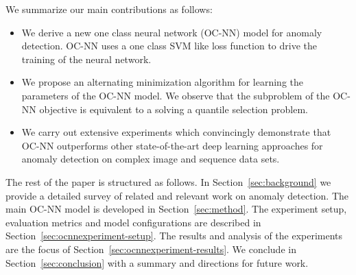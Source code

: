 
We summarize our main contributions as follows:
\begin{itemize}
\item We derive a new one class neural network (OC-NN) model for anomaly detection. OC-NN uses a one class SVM like loss function to drive the training
of the neural network.
\item We propose an alternating minimization algorithm for learning the parameters of the OC-NN model. We observe that the subproblem of
the OC-NN objective is equivalent to a solving a quantile selection problem.
\item We carry out extensive experiments which convincingly demonstrate  that OC-NN  outperforms other state-of-the-art deep learning approaches
for anomaly detection on complex image and sequence data sets.
\end{itemize}

The rest of the paper is structured as follows. In Section~\ref{sec:background} we provide a detailed survey of related and relevant
work on anomaly detection. The main OC-NN model is developed in Section~\ref{sec:method}. The experiment setup, evaluation metrics and
model configurations are described in Section~\ref{sec:ocnnexperiment-setup}. The results and analysis of the experiments are the focus of
Section~\ref{sec:ocnnexperiment-results}. We conclude in Section~\ref{sec:conclusion} with a summary and directions for future work.

